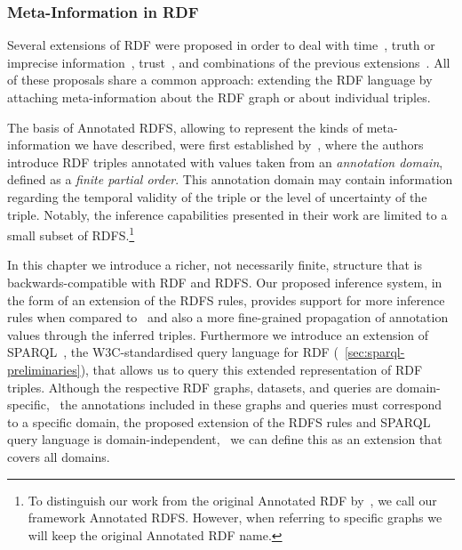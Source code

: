 \subsubsection*{Meta-Information in RDF}

Several extensions of \ac{RDF} were proposed in order to deal with
time~\cite{GutierrezHurtadoVaisman:2007aa,PuglieseUdreaSubrahmanian:2008aa,TappoletBernstein:2009aa}, truth or imprecise
information~\cite{MazzieriDragoni:2008aa,Straccia:2009aa}, trust~\cite{Hartig:2009ab,Schenk:2008aa}, and combinations of
the previous extensions~\cite{DividinoSizovStaab:2009aa}. 
%
All of these proposals share a common approach: extending the \ac{RDF} language by attaching meta-information about the
\ac{RDF} graph or about individual triples.



The basis of Annotated RDFS, allowing to represent the kinds of meta-information we have described, were first
established by~\citet{UdreaRecuperoSubrahmanian:2006aa,UdreaRecuperoSubrahmanian:2010aa}, where the authors introduce
\ac{RDF} triples annotated with values taken from an \emph{annotation domain}, defined as a \emph{finite partial order}.
%
This annotation domain may contain information regarding the temporal validity of the triple or the level of uncertainty
of the triple.
%
Notably, the inference capabilities presented in their work are limited to a small subset of \ac{RDFS}.\footnote{To
  distinguish our work from the original Annotated RDF by~\citeauthor{UdreaRecuperoSubrahmanian:2006aa}, we call our
  framework Annotated RDFS.  However, when referring to specific graphs we will keep the original Annotated RDF name.}


In this chapter we introduce a richer, not necessarily finite, structure that is backwards-compatible with \ac{RDF} and
\ac{RDFS}.  Our proposed inference system, in the form of an extension of the \ac{RDFS} rules, provides support for more
inference rules when compared to~\citet{UdreaRecuperoSubrahmanian:2010aa} and also a more fine-grained propagation of
annotation values through the inferred triples.
%
Furthermore we introduce an extension of SPARQL~\cite{PrudhommeauxSeaborne:2008aa}, the W3C-standardised query language
for \ac{RDF} (\cf~\cref{sec:sparql-preliminaries}), that allows us to query this extended representation of \ac{RDF}
triples.
%
Although the respective \ac{RDF} graphs, datasets, and queries are domain-specific, \ie~the annotations included in
these graphs and queries must correspond to a specific domain, the proposed extension of the \ac{RDFS} rules and SPARQL
query language is domain-independent, \ie~we can define this as an extension that covers all domains.



